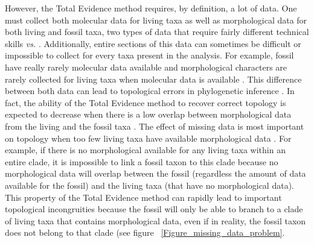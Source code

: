 \documentclass[12pt,letterpaper]{article}
\begin{document}
However, the Total Evidence method requires, by definition, a lot of data. One must collect both molecular data for living taxa as well as morphological data for both living and fossil taxa, two types of data that require fairly different technical skills \citep[e.g.][]{meredithimpacts2011} \textit{vs.} \citep{O'Leary08022013}. Additionally, entire sections of this data can sometimes be difficult or impossible to collect for every taxa present in the analysis. For example, fossil have really rarely molecular data available and morphological characters are rarely collected for living taxa when molecular data is available \citep[e.g.][]{slaterphylogenetic2013,beckancient2014}. This difference between both data can lead to topological errors in phylogenetic inference \citep{GuillermeCooper}. In fact, the ability of the Total Evidence method to recover correct topology is expected to decrease when there is a low overlap between morphological data from the living and the fossil taxa \citep{GuillermeCooper}. The effect of missing data is most important on topology when too few living taxa have available morphological data \citep{GuillermeCooper}. For example, if there is no morphological available for any living taxa within an entire clade, it is impossible to link a fossil taxon to this clade because no morphological data will overlap between the fossil (regardless the amount of data available for the fossil) and the living taxa (that have no morphological data). This property of the Total Evidence method can rapidly lead to important topological incongruities because the fossil will only be able to branch to a clade of living taxa that contains morphological data, even if in reality, the fossil taxon does not belong to that clade \citep{GuillermeCooper} (see figure ~\ref{Figure_missing_data_problem}.
\end{document}
